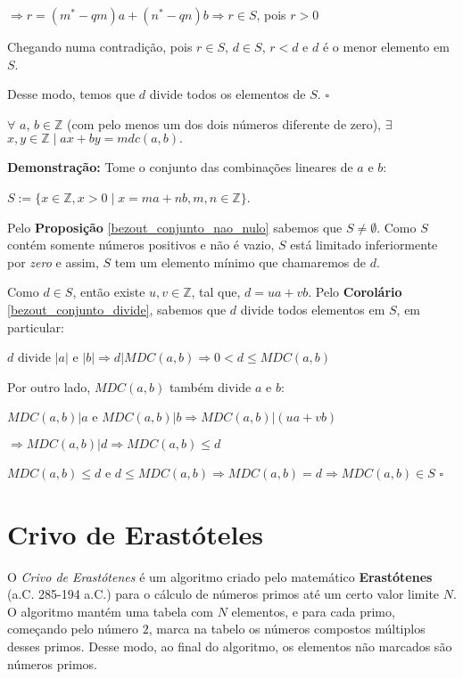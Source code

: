 $\Rightarrow r = (m^* - qm)a + (n^* - qn)b \Rightarrow r \in S$, pois $r > 0$

Chegando numa contradição, pois $r \in S$, $d \in S$, $r < d$ e $d$ é o menor elemento em $S$.

Desse modo, temos que $d$ divide todos os elementos de $S$. $\square$


\begin{theorem}\label{teorema_bezout}
$\forall$ $a$, $b \in \mathbb{Z}$ (com pelo menos um dos dois números diferente de zero), $\exists$ $x, y \in \mathbb{Z} \mid ax + by = mdc(a, b).$
\end{theorem}
\textbf{Demonstração:}
Tome o conjunto das combinações lineares de $a$ e $b$:

$S := \{x\in\mathbb{Z}, x>0 \mid x = ma + nb, m,n\in \mathbb{Z}\}$.

Pelo \textbf{Proposição} \autoref{bezout_conjunto_nao_nulo} sabemos que $S \neq \emptyset$. Como $S$ contém somente números positivos e não é vazio, 
$S$ está limitado inferiormente por \textit{zero} e assim, $S$ tem um elemento mínimo que chamaremos de $d$.

Como $d \in S$, então existe $u, v\in \mathbb{Z}$, tal que, $d = ua + vb$. Pelo \textbf{Corolário} \autoref{bezout_conjunto_divide}, sabemos que $d$ divide todos elementos em $S$, em particular:

$d$ divide $|a|$ e $|b| \Rightarrow d|MDC(a,b) \Rightarrow 0 < d \leq MDC(a,b)$

Por outro lado, $MDC(a,b)$ também divide $a$ e $b$:

$MDC(a,b)|a$ e $MDC(a,b)|b \Rightarrow MDC(a,b)|(ua + vb)$

$ \Rightarrow MDC(a,b)|d \Rightarrow MDC(a,b) \leq d$

$MDC(a,b)\leq d$ e $d \leq MDC(a,b) \Rightarrow MDC(a,b) = d \Rightarrow MDC(a,b) \in S$ $\square$






\section{Crivo de Erastóteles}

O \textit{Crivo de Erastótenes} é um algoritmo criado pelo matemático \textbf{Erastótenes} (a.C. 285-194 a.C.) para o cálculo de números primos
até um certo valor limite $N$.
O algoritmo mantém uma tabela com $N$ elementos, e para cada primo, começando pelo número $2$, marca na tabelo os números compostos múltiplos desses primos.
Desse modo, ao final do algoritmo, os elementos não marcados são números primos.\\
\clearpage

